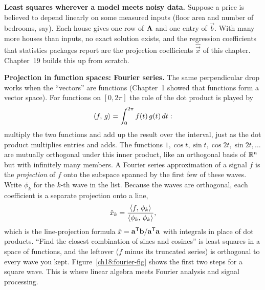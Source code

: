 \begin{applicationbox}
\textbf{Least squares wherever a model meets noisy data.} Suppose a price is believed to depend
linearly on some measured inputs (floor area and number of bedrooms, say). Each house gives one row
of $\mathbf{A}$ and one entry of $\vec{b}$. With many more houses than inputs, no exact solution
exists, and the regression coefficients that statistics packages report are the projection
coefficients $\hat{\vec{x}}$ of this chapter. Chapter~19 builds this up from scratch.
\end{applicationbox}

\begin{connectionbox}
\textbf{Projection in function spaces: Fourier series.} The same perpendicular drop works when the
``vectors'' are functions (Chapter~1 showed that functions form a vector space). For functions on
$[0,2\pi]$ the role of the dot product is played by
\[
  \langle f,\, g \rangle=\int_0^{2\pi} f(t)\,g(t)\,dt:
\]
multiply the two functions and add up the result over the interval, just as the dot product
multiplies entries and adds. The functions $1,\cos t,\sin t,\cos 2t,\sin 2t,\dots$ are mutually
orthogonal under this inner product, like an orthogonal basis of $\mathbb{R}^n$ but with infinitely many
members. A Fourier series approximation of a signal $f$ is the \emph{projection} of $f$ onto the
subspace spanned by the first few of these waves. Write $\phi_k$ for the $k$-th wave in the list.
Because the waves are orthogonal, each coefficient is a separate projection onto a line,
\[
  \hat{x}_k = \frac{\langle f,\, \phi_k \rangle}{\langle \phi_k,\, \phi_k \rangle},
\]
which is the line-projection formula $\hat{x}=\mathbf{a}^{\mathsf{T}}\mathbf{b}/\mathbf{a}^{\mathsf{T}}\mathbf{a}$ with integrals in
place of dot products. ``Find the closest combination of sines and cosines'' is least squares in a
space of functions, and the leftover ($f$ minus its truncated series) is orthogonal to every wave
you kept. Figure~\ref{ch18:fourier-fig} shows the first two steps for a square wave. This is where
linear algebra meets Fourier analysis and signal processing.
\end{connectionbox}


